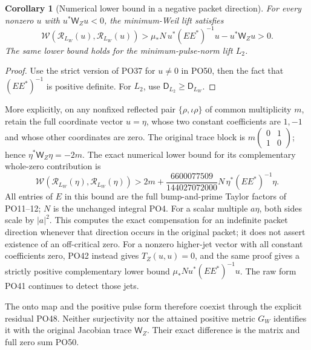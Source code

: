 \documentclass[11pt]{article}
\newtheorem{corollary}[theorem]{Corollary}
\begin{document}
\begin{corollary}[Numerical lower bound in a negative packet direction]
\label{cor:negative}
For every nonzero \(u\) with \(u^*\mathsf W_Zu<0\),
the minimum-Weil lift satisfies
\[
 \mathcal W(\mathcal R_{L_W}(u),\mathcal R_{L_W}(u))
 >\mu_*N\,u^*(EE^*)^{-1}u-u^*\mathsf W_Zu>0.
 \tag{PO52}\label{po:negative}
\]
The same lower bound holds for the minimum-pulse-norm lift \(L_2\).
\end{corollary}
\begin{proof}
Use the strict version of PO37 for \(u\ne0\) in PO50,
then the fact that \((EE^*)^{-1}\) is positive definite.
For \(L_2\), use \(\mathsf D_{L_2}\ge\mathsf D_{L_W}\).
\end{proof}

More explicitly, on any nonfixed reflected pair
\(\{\rho,\iota\rho\}\) of common multiplicity \(m\), retain the
full coordinate vector \(u=\eta\), whose two constant
coefficients are \(1,-1\) and whose other coordinates are zero.
The original trace block is
\(m\left(\begin{smallmatrix}0&1\\1&0\end{smallmatrix}\right)\);
hence \(\eta^*\mathsf W_Z\eta=-2m\).
The exact numerical lower bound for its complementary
whole-zero contribution is
\[
 \mathcal W(\mathcal R_{L_W}(\eta),\mathcal R_{L_W}(\eta))
 >2m+
    \frac{6600077509}{144027072000}
            N\,\eta^*(EE^*)^{-1}\eta .
 \tag{PO53}\label{po:pair-bound}
\]
All entries of \(E\) in this bound are the full bump-and-prime
Taylor factors of PO11--12; \(N\) is the unchanged integral PO4.
For a scalar multiple \(a\eta\), both sides scale by \(|a|^2\).
This computes the exact compensation for an indefinite packet
direction whenever that direction occurs in the original packet;
it does not assert existence of an off-critical zero.
For a nonzero higher-jet vector with all constant coefficients
zero, PO42 instead gives \(T_Z(u,u)=0\), and the same proof gives
a strictly positive complementary lower bound
\(\mu_*N u^*(EE^*)^{-1}u\).
The raw form PO41 continues to detect those jets.

The onto map and the positive pulse form therefore coexist
through the explicit residual PO48. Neither surjectivity nor
the attained positive metric \(G_W\) identifies it with
the original Jacobian trace \(\mathsf W_Z\).
Their exact difference is the matrix and full zero sum PO50.
\end{document}
